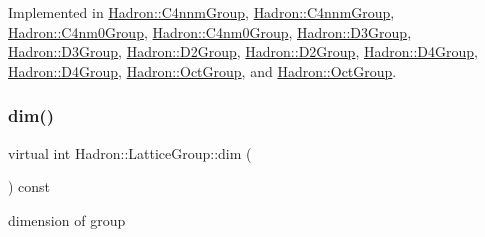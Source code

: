 Implemented in \mbox{\hyperlink{structHadron_1_1C4nnmGroup_ab40f44381ee83db2364e43bc2c3521e4}{Hadron\+::\+C4nnm\+Group}}, \mbox{\hyperlink{structHadron_1_1C4nnmGroup_ab40f44381ee83db2364e43bc2c3521e4}{Hadron\+::\+C4nnm\+Group}}, \mbox{\hyperlink{structHadron_1_1C4nm0Group_adc1a59b08c4fafae324e82e8ded86919}{Hadron\+::\+C4nm0\+Group}}, \mbox{\hyperlink{structHadron_1_1C4nm0Group_adc1a59b08c4fafae324e82e8ded86919}{Hadron\+::\+C4nm0\+Group}}, \mbox{\hyperlink{structHadron_1_1D3Group_a90114a92f0c05cdfd8ff56e33606d3c3}{Hadron\+::\+D3\+Group}}, \mbox{\hyperlink{structHadron_1_1D3Group_a90114a92f0c05cdfd8ff56e33606d3c3}{Hadron\+::\+D3\+Group}}, \mbox{\hyperlink{structHadron_1_1D2Group_a937ab7d9b4b21da1331b0c85728f7db9}{Hadron\+::\+D2\+Group}}, \mbox{\hyperlink{structHadron_1_1D2Group_a937ab7d9b4b21da1331b0c85728f7db9}{Hadron\+::\+D2\+Group}}, \mbox{\hyperlink{structHadron_1_1D4Group_a5969c3afe94d4c6ada166f7dc161a355}{Hadron\+::\+D4\+Group}}, \mbox{\hyperlink{structHadron_1_1D4Group_a5969c3afe94d4c6ada166f7dc161a355}{Hadron\+::\+D4\+Group}}, \mbox{\hyperlink{structHadron_1_1OctGroup_a1db49add38b9263bfd536b3da0cc1566}{Hadron\+::\+Oct\+Group}}, and \mbox{\hyperlink{structHadron_1_1OctGroup_a1db49add38b9263bfd536b3da0cc1566}{Hadron\+::\+Oct\+Group}}.

\mbox{\label{structHadron_1_1LatticeGroup_abd8415698323796ef6a8605796ee3bea}} 
\subsubsection{\texorpdfstring{dim()}{dim()}\hspace{0.1cm}{\footnotesize\ttfamily [2/2]}}
{\footnotesize\ttfamily virtual int Hadron\+::\+Lattice\+Group\+::dim (\begin{DoxyParamCaption}{ }\end{DoxyParamCaption}) const\hspace{0.3cm}{\ttfamily [pure virtual]}}

dimension of group 

